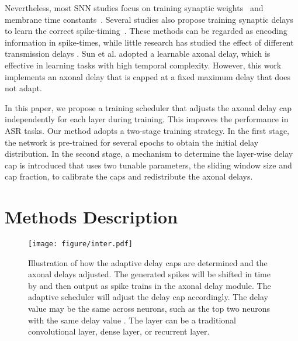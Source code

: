 \documentclass{article}
\begin{document}
Nevertheless, most SNN studies focus on training synaptic weights~\cite{shrestha2017robust} and membrane time constants~\cite{perez2021neural, fang2021incorporating}. Several studies also propose training synaptic delays to learn the correct spike-timing~\cite{Shrestha2018,zhang2020supervised}. These methods can be regarded as encoding information in spike-times, while little research has studied the effect of different transmission delays \cite{Shrestha2018}. Sun et al.\cite{Sun2022} adopted a learnable axonal delay, which is effective in learning tasks with high temporal complexity. However, this work implements an axonal delay that is capped at a fixed maximum delay that does not adapt. 

In this paper, we propose a training scheduler that adjusts the axonal delay cap independently for each layer during training. This improves the performance in ASR tasks. Our method adopts a two-stage training strategy. In the first stage, the network is pre-trained for several epochs to obtain the initial delay distribution. In the second stage, a mechanism to determine the layer-wise delay cap is introduced that uses two tunable parameters, the sliding window size and cap fraction, to calibrate the caps and redistribute the axonal delays.

\iffalse
The remainder of this paper is structured as follows. In
Section \ref{2} we describe the spiking neuron model and proposed adaptive training method. The description of our experimental setup is given in Section \ref{3}. In Section \ref{4}, we demonstrate the effectiveness of the proposed method on two event-based audio datasets before concluding in Section \ref{5}.
\fi
\section{Methods Description} \label{2}
\begin{figure*}[htbp]
\centering
\vspace{-0.8cm}
\hspace{-7cm}
\texttt{[image: figure/inter.pdf]}\vspace{-4cm}\hspace{-5cm}
	\caption{Illustration of how the adaptive delay caps are determined and the axonal delays adjusted. The generated spikes  will be shifted in time by  and then output as spike trains  in the axonal delay module. The adaptive scheduler will adjust the delay cap accordingly. The delay value may be the same across neurons, such as the top two neurons with the same delay value . The layer can be a traditional convolutional layer, dense layer, or recurrent layer.}
\label{fig:input}
\end{figure*}
\end{document}
